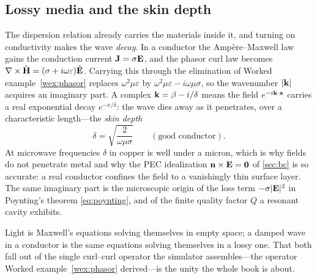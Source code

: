 \subsection{Lossy media and the skin depth}

The dispersion relation already carries the materials inside it, and turning on
conductivity makes the wave \emph{decay}. In a conductor the
Amp\`ere--Maxwell law gains the conduction current $\mathbf{J}=\sigma\mathbf{E}$, and the
phasor curl law becomes $\nabla\times\hat{\mathbf{H}}=(\sigma+i\omega\varepsilon)\hat{\mathbf{E}}$.
Carrying this through the elimination of Worked example~\ref{wex:phasor} replaces
$\omega^2\mu\varepsilon$ by $\omega^2\mu\varepsilon - i\omega\mu\sigma$, so the
wavenumber $\lvert\mathbf{k}\rvert$ acquires an imaginary part. A complex $\mathbf{k}=\beta - i/\delta$
means the field $e^{-i\mathbf{k}\cdot\mathbf{x}}$ carries a real exponential decay
$e^{-x/\delta}$: the wave dies away as it penetrates, over a characteristic
length---the \emph{skin depth}
\[
  \delta = \sqrt{\frac{2}{\omega\mu\sigma}}\qquad(\text{good conductor}).
\]
At microwave frequencies $\delta$ in copper is well under a micron, which is why
fields do not penetrate metal and why the PEC idealization
$\mathbf{n}\times\mathbf{E}=\bm0$ of \cref{sec:bc} is so accurate: a real conductor confines
the field to a vanishingly thin surface layer. The same imaginary part is the
microscopic origin of the loss term $-\sigma\lvert\mathbf{E}\rvert^2$ in Poynting's theorem
\eqref{eq:poynting}, and of the finite quality factor $Q$ a resonant cavity
exhibits.

Light is Maxwell's equations solving themselves in empty space; a damped wave
in a conductor is the same equations solving themselves in a lossy one. That
both fall out of the single curl--curl operator the simulator assembles---the
operator Worked example~\ref{wex:phasor} derived---is the unity the whole book is about.

